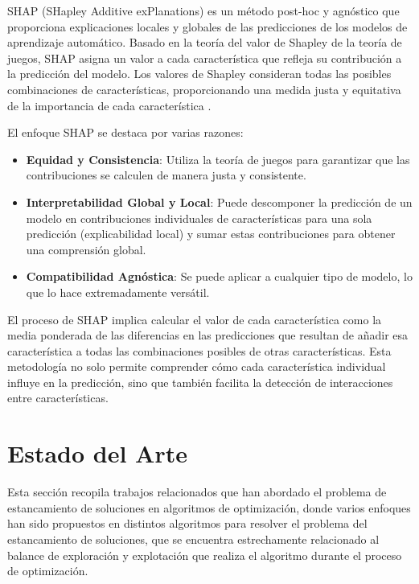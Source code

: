 \vspace{1mm}
\normalsize

SHAP (SHapley Additive exPlanations) es un método post-hoc y agnóstico que proporciona explicaciones locales y globales de las predicciones de los modelos de aprendizaje automático. Basado en la teoría del valor de Shapley de la teoría de juegos, SHAP asigna un valor a cada característica que refleja su contribución a la predicción del modelo. Los valores de Shapley consideran todas las posibles combinaciones de características, proporcionando una medida justa y equitativa de la importancia de cada característica \cite{lundberg2017unifiedapproachinterpretingmodel}.

El enfoque SHAP se destaca por varias razones:
\begin{itemize}
    \item \textbf{Equidad y Consistencia}: Utiliza la teoría de juegos para garantizar que las contribuciones se calculen de manera justa y consistente.
    \item \textbf{Interpretabilidad Global y Local}: Puede descomponer la predicción de un modelo en contribuciones individuales de características para una sola predicción (explicabilidad local) y sumar estas contribuciones para obtener una comprensión global.
    \item \textbf{Compatibilidad Agnóstica}: Se puede aplicar a cualquier tipo de modelo, lo que lo hace extremadamente versátil.
\end{itemize}

El proceso de SHAP implica calcular el valor de cada característica como la media ponderada de las diferencias en las predicciones que resultan de añadir esa característica a todas las combinaciones posibles de otras características. Esta metodología no solo permite comprender cómo cada característica individual influye en la predicción, sino que también facilita la detección de interacciones entre características.

\vspace{2mm}








\section{Estado del Arte}
\label{sc:EA}

Esta sección recopila trabajos relacionados que han abordado el problema de estancamiento de soluciones en algoritmos de optimización, donde varios enfoques han sido propuestos en distintos algoritmos para resolver el problema del estancamiento de soluciones, que se encuentra estrechamente relacionado al balance de exploración y explotación que realiza el algoritmo durante el proceso de optimización.

